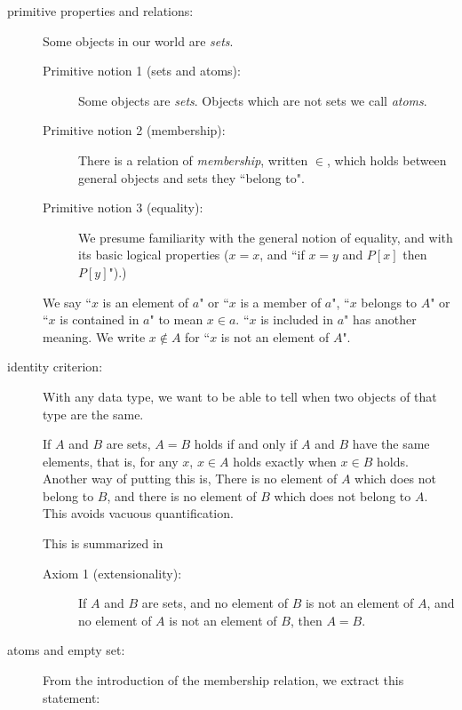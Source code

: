 \documentclass[12pt]{article}
\begin{document}
\begin{description}

\item[primitive properties and relations:]  Some objects in our world are {\em sets\/}.  

\begin{description}

\item[Primitive notion 1 (sets and atoms):]  Some objects are {\em sets\/}.  Objects which are not sets we call {\em atoms\/}.

\item[Primitive notion 2 (membership):]  There is a relation of {\em membership}, written $\in$, which holds between general objects and sets they ``belong to".

\item[Primitive notion 3 (equality):]  We presume familiarity with the general notion of equality, and with its basic logical properties ($x=x$, and ``if $x=y$ and $P[x]$ then $P[y]$").)

\end{description} 

We say ``$x$ is an element of $a$" or ``$x$ is a member of $a$", ``$x$ belongs to $A$" or ``$x$ is contained in $a$" to mean $x \in a$.   ``$x$ is included in $a$" has another meaning.  We write $x \not\in A$ for ``$x$ is not an element of $A$".

\item[identity criterion:]  With any data type, we want to be able to tell when two objects of that type are the same.

If $A$ and $B$ are sets, $A=B$ holds if and only if $A$ and $B$ have the same elements, that is, for any $x$, $x \in A$ holds exactly when $x \in B$ holds.   Another way of putting this is, There is no element of $A$ which does not belong to $B$, and there is no element of $B$ which does not belong to $A$.  This avoids vacuous quantification.

This is summarized in

\begin{description}

\item[Axiom 1 (extensionality):]  If $A$ and $B$ are sets, and no element of $B$ is not an element of $A$, and no element of $A$ is not an element of $B$, then $A=B$.

\end{description}

\item[atoms and empty set:]   From the introduction of the membership relation, we extract this statement:  


\end{description}
\end{document}

